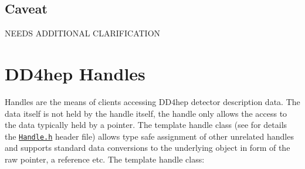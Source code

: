 \subsection{Caveat}
\label{sec:dd4hep-user-manual-caveat}
NEEDS ADDITIONAL CLARIFICATION

\section{DD4hep Handles}
\label{sec:dd4hep-user-manual-handles}

Handles are the means of clients accessing DD4hep detector description data. The data itself is not held by the handle itself, the handle only allows the access to the data typically held by a pointer. The template handle class (see for details the \href{https://dd4hep.web.cern.ch/dd4hep/reference/classdd4hep_1_1Handle.html}{\texttt{Handle.h}} header file) allows type safe assignment of other unrelated handles and supports standard data conversions to the underlying object in form of the raw pointer, a reference etc. The template handle class:

